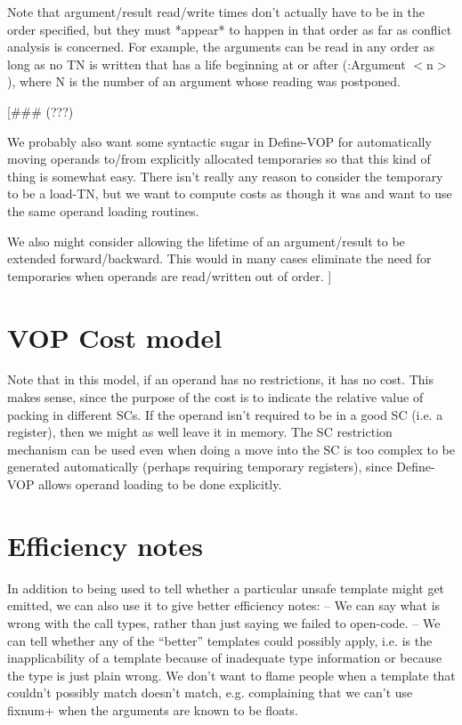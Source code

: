 Note that argument/result read/write times don't actually have to be in the
order specified, but they must *appear* to happen in that order as far as
conflict analysis is concerned.  For example, the arguments can be read in any
order as long as no TN is written that has a life beginning at or after
(:Argument $<$n$>$), where N is the number of an argument whose reading was
postponed.

[\#\#\# (???)

We probably also want some syntactic sugar in Define-VOP for automatically
moving operands to/from explicitly allocated temporaries so that this kind of
thing is somewhat easy.  There isn't really any reason to consider the
temporary to be a load-TN, but we want to compute costs as though it was and
want to use the same operand loading routines.

We also might consider allowing the lifetime of an argument/result to be
extended forward/backward.  This would in many cases eliminate the need for
temporaries when operands are read/written out of order.
]


\section{VOP Cost model}

Note that in this model, if an operand has no restrictions, it has no cost.
This makes sense, since the purpose of the cost is to indicate the
relative value of packing in different SCs.  If the operand isn't required to
be in a good SC (i.e. a register), then we might as well leave it in memory.
The SC restriction mechanism can be used even when doing a move into the SC is
too complex to be generated automatically (perhaps requiring temporary
registers), since Define-VOP allows operand loading to be done explicitly.


\section{Efficiency notes}

  In addition to
being used to tell whether a particular unsafe template might get emitted, we
can also use it to give better efficiency notes:
 -- We can say what is wrong with the call types, rather than just saying we
    failed to open-code.
 -- We can tell whether any of the ``better'' templates could possibly apply,
    i.e. is the inapplicability of a template because of inadequate type
    information or because the type is just plain wrong.  We don't want to
    flame people when a template that couldn't possibly match doesn't match,
    e.g. complaining that we can't use fixnum+ when the arguments are known to
    be floats.


